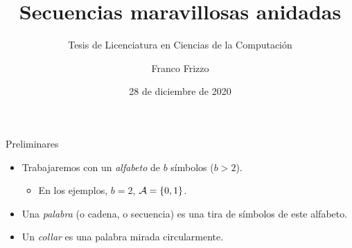 \documentclass[spanish,xcolor={table}]{beamer}
\title{Secuencias maravillosas anidadas}
\subtitle{Tesis de Licenciatura en Ciencias de la Computación}
\author{Franco Frizzo}
\institute[DC, FCEyN, UBA]
    {Departamento de Computación, FCEyN, UBA}
\date{28 de diciembre de 2020}
\begin{document}
\frame{\titlepage}


\begin{frame}{Preliminares}

\begin{itemize}
  \item Trabajaremos con un \emph{alfabeto} de $b$ símbolos ($b > 2$).
  \begin{itemize}
    \item En los ejemplos, $b = 2$, $\mathcal{A} = \lbrace 0, 1 \rbrace$.
  \end{itemize}
  \item Una \emph{palabra} (o cadena, o secuencia) es una tira de símbolos de este alfabeto.
  
  \item Un \emph{collar} es una palabra mirada circularmente.
\end{itemize}

\end{frame}

\end{document}
